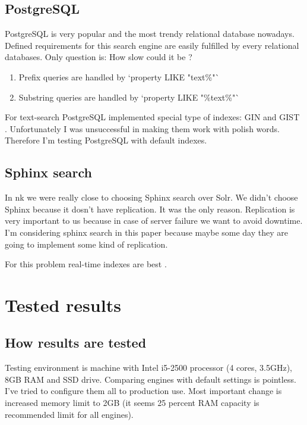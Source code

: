 \documentclass[10pt,a4paper]{article}
\begin{document}
\subsection{PostgreSQL}

PostgreSQL is very popular and the most trendy relational database nowadays. Defined requirements for this search engine are easily fulfilled by every relational databases. Only question is: How slow could it be ?

\begin{enumerate}
\item Prefix queries are handled by `property LIKE "text\%"`
\item Substring queries are handled by `property LIKE "\%text\%"`
\end{enumerate}

For text-search PostgreSQL implemented special type of indexes: GIN \cite{PSQLGIN} and GIST \cite{PSQLGIST}. Unfortunately I was unsuccessful in making them work with polish words. Therefore I'm testing PostgreSQL with default indexes.

\subsection{Sphinx search}

In nk we were really close to choosing Sphinx search over Solr. We didn't choose Sphinx because it dosn't have replication. It was the only reason. Replication is very important to us because in case of server failure we want to avoid downtime. I'm considering sphinx search in this paper because maybe some day they are going to implement some kind of replication.

For this problem real-time indexes are best \cite{SPHINXRT}.

\section{Tested results}

\subsection{How results are tested}

Testing environment is machine with Intel i5-2500 processor (4 cores, 3.5GHz), 8GB RAM and SSD drive. Comparing engines with default settings is pointless. I've tried to configure them all to production use. Most important change is increased memory limit to 2GB (it seems 25 percent RAM capacity is recommended limit for all engines).
\end{document}

